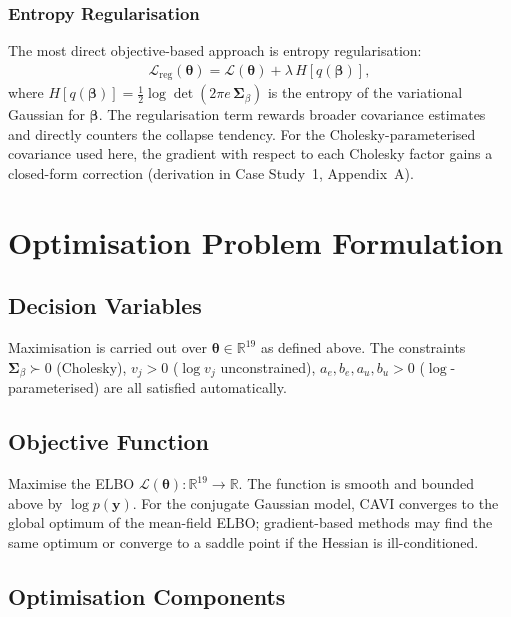 \documentclass[11pt,a4paper]{article}
\newcommand{\R}{\mathbb{R}}
\begin{document}
\subsubsection{Entropy Regularisation}

The most direct objective-based approach is entropy regularisation:
\begin{align}
  \mathcal{L}_{\mathrm{reg}}(\bm{\theta})
  = \mathcal{L}(\bm{\theta}) + \lambda\, H[q(\bm{\beta})],
\end{align}
where $H[q(\bm{\beta})] = \tfrac{1}{2}\log\det(2\pi e\,\bm{\Sigma}_\beta)$
is the entropy of the variational Gaussian for $\bm{\beta}$.
The regularisation term rewards broader covariance estimates and directly
counters the collapse tendency.
For the Cholesky-parameterised covariance used here, the gradient with respect
to each Cholesky factor gains a closed-form correction (derivation in Case
Study~1, Appendix~A).

\section{Optimisation Problem Formulation}

\subsection*{Decision Variables}

Maximisation is carried out over $\bm{\theta} \in \R^{19}$ as defined above.
The constraints $\bm{\Sigma}_\beta \succ 0$ (Cholesky), $v_j > 0$ ($\log v_j$
unconstrained), $a_e, b_e, a_u, b_u > 0$ ($\log$-parameterised) are all
satisfied automatically.

\subsection*{Objective Function}

Maximise the ELBO $\mathcal{L}(\bm{\theta}):\R^{19}\to\R$.
The function is smooth and bounded above by $\log p(\mathbf{y})$.
For the conjugate Gaussian model, CAVI converges to the global optimum of the
mean-field ELBO; gradient-based methods may find the same optimum or converge
to a saddle point if the Hessian is ill-conditioned.

\subsection*{Optimisation Components}
\end{document}
